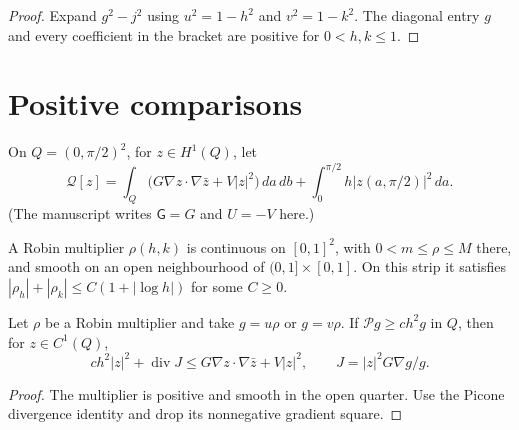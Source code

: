 \begin{proof}
\leanok
Expand $g^2-j^2$ using $u^2=1-h^2$ and $v^2=1-k^2$.
The diagonal entry $g$ and every coefficient in the bracket are positive
for $0<h,k\le1$.
\end{proof}

\section{Positive comparisons}

\begin{definition}
\label{def:comparison-form}
\leanok
On $Q=(0,\pi/2)^2$, for $z\in H^1(Q)$, let
\[
  \mathcal Q[z]=\int_Q\big(G\nabla z\cdot\nabla\bar z+V|z|^2\big)\,da\,db
  +\int_0^{\pi/2}h|z(a,\pi/2)|^2\,da .
\]
(The manuscript writes $\mathsf G=G$ and $U=-V$ here.)
\end{definition}

\begin{definition}
\label{def:mixed-robin-multiplier}
\leanok
A Robin multiplier $\rho(h,k)$ is continuous on $[0,1]^2$, with
$0<m\le\rho\le M$ there, and smooth on an open neighbourhood of
$(0,1]\times[0,1]$. On this strip it satisfies
$|\rho_h|+|\rho_k|\le C(1+|\log h|)$ for some $C\ge0$.
\end{definition}

\begin{lemma}
\label{lem:mixed-robin-picone}
\leanok
Let $\rho$ be a Robin multiplier and take $g=u\rho$ or $g=v\rho$.
If $\mathcal Pg\ge ch^2g$ in $Q$, then for $z\in C^1(Q)$,
\[
 ch^2|z|^2+\operatorname{div}J
 \le G\nabla z\cdot\nabla\bar z+V|z|^2,\qquad
 J=|z|^2G\nabla g/g .
\]
\end{lemma}

\begin{proof}
\leanok
The multiplier is positive and smooth in the open quarter. Use the Picone
divergence identity and drop its nonnegative gradient square.
\end{proof}

